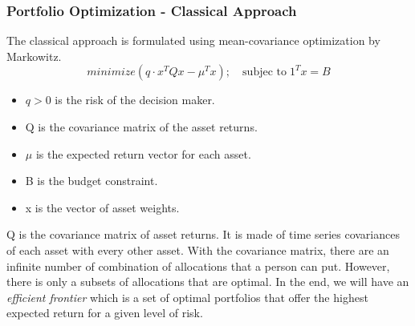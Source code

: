 \documentclass{beamer}
\begin{document}
\begin{frame}
	\frametitle{Portfolio Optimization - Classical Approach}
    The classical approach is formulated using mean-covariance optimization by Markowitz.
	\begin{equation}minimize(q \cdot x^T Q x - \mu^T x); \quad \text{subjec to} \; 1^T x = B \end{equation}
	\begin{itemize}
		\item \(q > 0\) is the risk of the decision maker. 
		\item Q is the covariance matrix of the asset returns.
		\item \(\mu\) is the expected return vector for each asset.
		\item B is the budget constraint.
		\item x is the vector of asset weights.
	\end{itemize}
\end{frame}
\begin{frame}
	Q is the covariance matrix of asset returns. It is made of  time series covariances of each asset with every other asset. With the covariance matrix, there are an infinite number of combination
	of allocations that a person can put. However, there is only a subsets of allocations that are optimal. In the end, we will have an \textit{efficient frontier} which is a set of optimal portfolios that offer the highest expected return for a given level of risk.
\end{frame}
\end{document}

